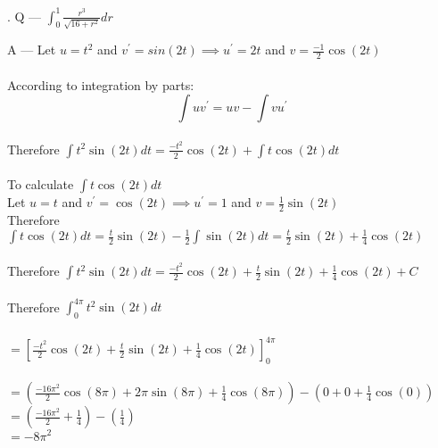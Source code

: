 \documentclass{article}
\newcounter{question}
\begin{document}
\newcommand\Que[1]{%
   \leavevmode\par
   \stepcounter{question}
   \noindent
   \thequestion. Q --- #1\par}

\newcommand\Ans[2][]{%
    \leavevmode\par\noindent
   {A --- \textbf{#1}#2\par}}

\Que{ $ \int_{0}^{1}{ \frac{r^3}{\sqrt{16+r^2}} } dr $ }
\Ans
{
Let $ u = t^2 $ and $ v^{\prime} = sin(2t) 
\implies u^{\prime} = 2t $ and $ v = \frac{-1}{2}\cos(2t) $\\\\

According to integration by parts:\\
$$\int{uv^{\prime}}=uv-\int{vu^{\prime}}$$\\

Therefore $ \int{t^2\sin(2t)} dt 
= \frac{-t^2}{2}\cos(2t) + \int{ t\cos(2t) } dt $\\\\

To calculate $ \int{ t\cos(2t) } dt $\\

Let $ u = t $ and $ v^{\prime} = \cos(2t)
\implies u^{\prime} = 1 $ and $ v = \frac{1}{2}\sin(2t) $\\

Therefore $ \int{ t\cos(2t) } dt
= \frac{t}{2}\sin(2t) - \frac{1}{2}\int{ \sin(2t) } dt
= \frac{t}{2}\sin(2t) + \frac{1}{4}\cos(2t) $\\\\

Therefore $ \int{t^2\sin(2t)} dt 
= \frac{-t^2}{2}\cos(2t) + \frac{t}{2}\sin(2t) + \frac{1}{4}\cos(2t) + C $\\\\

Therefore $ \int_{0}^{4\pi}{t^2\sin(2t)} dt $\\\\

$ = \left[\frac{-t^2}{2}\cos(2t) + \frac{t}{2}\sin(2t) + \frac{1}{4}\cos(2t) \right]_{0}^{4\pi} $\\\\

$ = (
      \frac{-16\pi^2}{2}\cos(8\pi)
      + 2\pi\sin(8\pi)
      + \frac{1}{4}\cos(8\pi)
   ) - (
      0 + 0 + \frac{1}{4}\cos(0)
   ) $\\

$ = (\frac{-16\pi^2}{2} + \frac{1}{4}) 
- (\frac{1}{4}) $\\

$ = -8\pi^2 $\\

}
\end{document}
